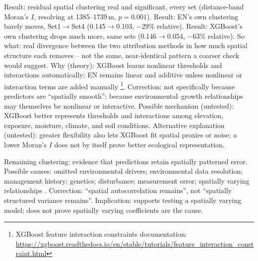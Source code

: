 \documentclass[logo,msc,ai]{infthesis}           %
\begin{document}
Result: residual spatial clustering real and significant, every set (distance-band
Moran's $I$, resolving at 1385--1739\,m, $p=0.001$).
Result: EN's own clustering barely moves, Set1$\to$Set4 (0.145$\to$0.103, $-29\%$
relative).
Result: XGBoost's own clustering drops much more, same sets (0.146$\to$0.054,
$-63\%$ relative).
So what: real divergence between the two attribution methods in how much spatial
structure each removes -- not the same, near-identical pattern a coarser check
would suggest.
Why (theory): XGBoost learns nonlinear thresholds and interactions automatically;
EN remains linear and additive unless nonlinear or interaction terms are added
manually \cite{zou2005Regularization_C4_NN}\footnote{XGBoost feature interaction
constraints documentation: \url{https://xgboost.readthedocs.io/en/stable/tutorials/feature_interaction_constraint.html}}.
Correction: not specifically because predictors are ``spatially smooth''; because
environmental--growth relationships may themselves be nonlinear or interactive.
Possible mechanism (untested): XGBoost better represents thresholds and
interactions among elevation, exposure, moisture, climate, and soil conditions.
Alternative explanation (untested): greater flexibility also lets XGBoost fit
spatial proxies or noise; a lower Moran's $I$ does not by itself prove better
ecological representation.

Remaining clustering: evidence that predictions retain spatially patterned error.
Possible causes: omitted environmental drivers; environmental data resolution;
management history; genetics; disturbance; measurement error; spatially varying
relationships \cite{gaspard2019Residual_C5_EVAL}.
Correction: ``spatial autocorrelation remains'', not ``spatially structured
variance remains''.
Implication: supports testing a spatially varying model; does not prove spatially
varying coefficients are the cause.
\end{document}
